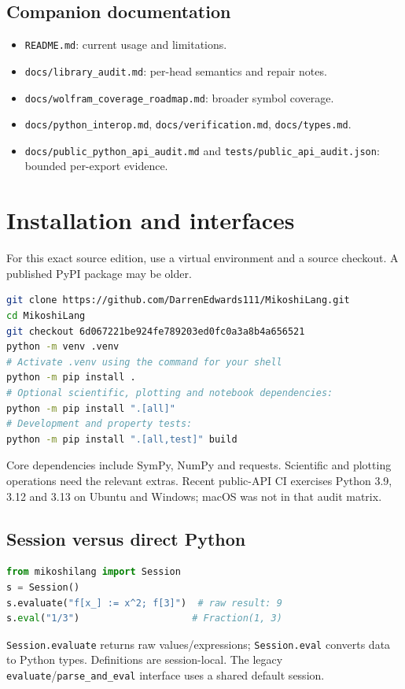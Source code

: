 \documentclass[11pt,a4paper]{article}
\begin{document}
\subsection{Companion documentation}
\begin{itemize}
\item \texttt{README.md}: current usage and limitations.
\item \texttt{docs/library\_audit.md}: per-head semantics and repair notes.
\item \texttt{docs/wolfram\_coverage\_roadmap.md}: broader symbol coverage.
\item \texttt{docs/python\_interop.md}, \texttt{docs/verification.md}, \texttt{docs/types.md}.
\item \texttt{docs/public\_python\_api\_audit.md} and \texttt{tests/public\_api\_audit.json}: bounded per-export evidence.
\end{itemize}

\section{Installation and interfaces}
For this exact source edition, use a virtual environment and a source checkout. A published PyPI package may be older.
\begin{lstlisting}[language=bash]
git clone https://github.com/DarrenEdwards111/MikoshiLang.git
cd MikoshiLang
git checkout 6d067221be924fe789203ed0fc0a3a8b4a656521
python -m venv .venv
# Activate .venv using the command for your shell
python -m pip install .
# Optional scientific, plotting and notebook dependencies:
python -m pip install ".[all]"
# Development and property tests:
python -m pip install ".[all,test]" build
\end{lstlisting}
Core dependencies include SymPy, NumPy and requests. Scientific and plotting operations need the relevant extras. Recent public-API CI exercises Python 3.9, 3.12 and 3.13 on Ubuntu and Windows; macOS was not in that audit matrix.

\subsection{Session versus direct Python}
\begin{lstlisting}[language=Python]
from mikoshilang import Session
s = Session()
s.evaluate("f[x_] := x^2; f[3]")  # raw result: 9
s.eval("1/3")                    # Fraction(1, 3)
\end{lstlisting}
\texttt{Session.evaluate} returns raw values/expressions; \texttt{Session.eval} converts data to Python types. Definitions are session-local. The legacy \texttt{evaluate}/\texttt{parse\_and\_eval} interface uses a shared default session.
\end{document}
